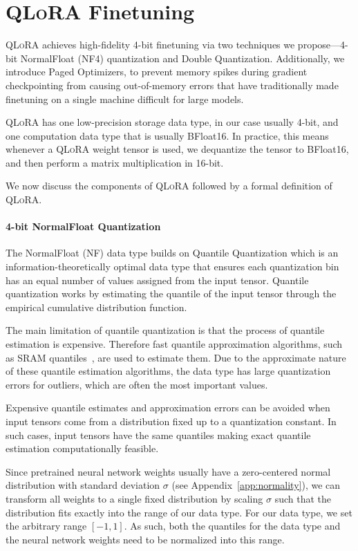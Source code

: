 \section{\textsc{QLoRA} Finetuning}

\textsc{QLoRA} achieves high-fidelity 4-bit finetuning via two techniques we propose—4-bit NormalFloat (NF4) quantization and Double Quantization. Additionally, we introduce Paged Optimizers, to prevent memory spikes during gradient checkpointing from causing out-of-memory errors that have traditionally made finetuning on a single machine difficult for large models.

\textsc{QLoRA} has one low-precision storage data type, in our case usually 4-bit, and one computation data type that is usually BFloat16. In practice, this means whenever a \textsc{QLoRA} weight tensor is used, we dequantize the tensor to BFloat16, and then perform a matrix multiplication in 16-bit. 

We now discuss the components of \textsc{QLoRA} followed by a formal definition of \textsc{QLoRA}.

\paragraph{4-bit NormalFloat Quantization} The NormalFloat (NF) data type builds on Quantile Quantization \citep{dettmers2022optimizers} which is an information-theoretically optimal data type that ensures each quantization bin has an equal number of values assigned from the input tensor. Quantile quantization works by estimating the quantile of the input tensor through the empirical cumulative distribution function. 

The main limitation of quantile quantization is that the process of quantile estimation is expensive. Therefore fast quantile approximation algorithms, such as SRAM quantiles~\citep{dettmers2022optimizers}, are used to estimate them. Due to the approximate nature of these quantile estimation algorithms, the data type has large quantization errors for outliers, which are often the most important values.

Expensive quantile estimates and approximation errors can be avoided when input tensors come from a distribution fixed up to a quantization constant. In such cases, input tensors have the same quantiles making exact quantile estimation computationally feasible.

Since pretrained neural network weights usually have a zero-centered normal distribution with standard deviation $\sigma$ (see Appendix~\ref{app:normality}), we can transform all weights to a single fixed distribution by scaling $\sigma$ such that the distribution fits exactly into the range of our data type. For our data type, we set the arbitrary range $[-1, 1]$. As such, both the quantiles for the data type and the neural network weights need to be normalized into this range.

